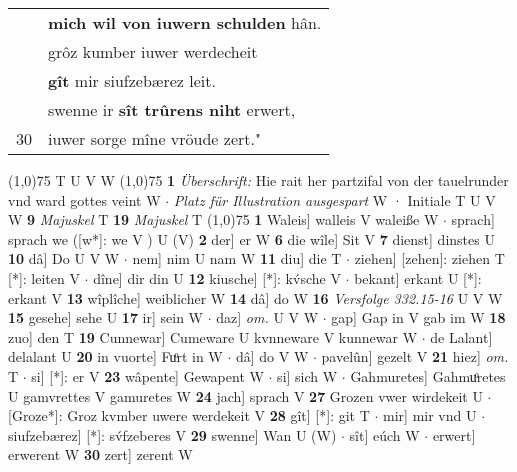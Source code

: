 \documentclass[8pt,a4paper,notitlepage]{article}
\begin{document}
\begin{table}[ht]
\begin{minipage}[t]{0.5\linewidth}
\begin{tabular}{rl}
 & \textbf{mich wil von iuwern schulden} hân.\\ 
 & grôz kumber iuwer werdecheit\\ 
 & \textbf{gît} mir siufzebærez leit.\\ 
 & swenne ir \textbf{sît trûrens niht} erwert,\\ 
30 & iuwer sorge mîne vröude zert."\\ 
\end{tabular}
\scriptsize
\line(1,0){75} \newline
T U V W \newline
\line(1,0){75} \newline
\textbf{1} \textit{Überschrift:} Hie rait her partzifal von der tauelrunder vnd ward gottes veint W   $\cdot$ \textit{Platz für Illustration ausgespart} W  · Initiale T U V W  \textbf{9} \textit{Majuskel} T  \textbf{19} \textit{Majuskel} T  \newline
\line(1,0){75} \newline
\textbf{1} Waleis] walleis V waleiße W  $\cdot$ sprach] sprach we ([w*]: we V ) U (V) \textbf{2} der] er W \textbf{6} die wîle] Sit V \textbf{7} dienst] dinstes U \textbf{10} dâ] Do U V W  $\cdot$ nem] nim U nam W \textbf{11} diu] die T  $\cdot$ ziehen] [zehen]: ziehen T [*]: leiten V  $\cdot$ dîne] dir din U \textbf{12} kiusche] [*]: kv́sche V  $\cdot$ bekant] erkant U [*]: erkant V \textbf{13} wîplîche] weiblicher W \textbf{14} dâ] do W \textbf{16} \textit{Versfolge 332.15-16} U V W  \textbf{15} gesehe] sehe U \textbf{17} ir] sein W  $\cdot$ daz] \textit{om.} U V W  $\cdot$ gap] Gap in V gab im W \textbf{18} zuo] den T \textbf{19} Cunnewar] Cumeware U kvnneware V kunnewar W  $\cdot$ de Lalant] delalant U \textbf{20} in vuorte] Fuͦrt in W  $\cdot$ dâ] do V W  $\cdot$ pavelûn] gezelt V \textbf{21} hiez] \textit{om.} T  $\cdot$ si] [*]: er V \textbf{23} wâpente] Gewapent W  $\cdot$ si] sich W  $\cdot$ Gahmuretes] Gahmuͦretes U gamvrettes V gamuretes W \textbf{24} jach] sprach V \textbf{27} Grozen vwer wirdekeit U  $\cdot$ [Groze*]: Groz kvmber uwere werdekeit V \textbf{28} gît] [*]: git T  $\cdot$ mir] mir vnd U  $\cdot$ siufzebærez] [*]: sv́fzeberes V \textbf{29} swenne] Wan U (W)  $\cdot$ sît] eúch W  $\cdot$ erwert] erwerent W \textbf{30} zert] zerent W \newline
\end{minipage}
\end{table}
\end{document}
